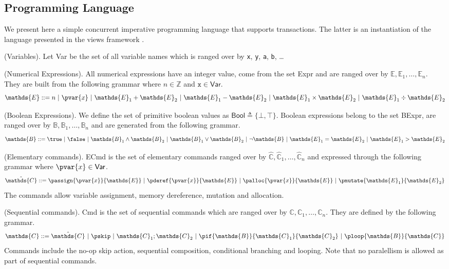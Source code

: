 \subsection{Programming Language}
\label{language}

We present here a simple concurrent imperative programming language that supports transactions. The latter is an instantiation of the language presented in the views framework \cite{views}.

 (Variables). Let \textsf{Var} be the set of all variable names which is ranged over by \texttt{x}, \texttt{y}, \texttt{a}, \texttt{b}, \ldots

 (Numerical Expressions). All numerical expressions have an integer value, come from the set \textsf{Expr} and are ranged over by $\mathds{E}, \mathds{E}_1, \ldots, \mathds{E}_n$. They are built from the following grammar where $n \in \mathds{Z}$ and $\mathtt{x} \in \mathsf{Var}$.
\[
	\mathds{E} ::=
		n\
		|\ \pvar{x}\
		|\ \mathds{E}_1 + \mathds{E}_2\
		|\ \mathds{E}_1 - \mathds{E}_2\
		|\ \mathds{E}_1 \times \mathds{E}_2\
		|\ \mathds{E}_1 \div \mathds{E}_2
\]

\defn (Boolean Expressions). We define the set of primitive boolean values as $\mathsf{Bool} \triangleq \{ \bot, \top \}$. Boolean expressions belong to the set \textsf{BExpr}, are ranged over by $\mathds{B}, \mathds{B}_1, \ldots, \mathds{B}_n$ and are generated from the following grammar.
\[
	\mathds{B} ::=
		\true\
		|\ \false\
		|\ \mathds{B}_1 \land \mathds{B}_2\
		|\ \mathds{B}_1 \lor \mathds{B}_2\
		|\ \lnot \mathds{B}\
		|\ \mathds{E}_1 = \mathds{E}_2\
		|\ \mathds{E}_1 > \mathds{E}_2
\]

 (Elementary commands). \textsf{ECmd} is the set of elementary commands ranged over by $\hat{\mathds{C}}, \hat{\mathds{C}}_1, \ldots, \hat{\mathds{C}}_n$ and expressed through the following grammar where $\pvar{x} \in \mathsf{Var}$.
\[
	\hat{\mathds{C}} ::=
		\passign{\pvar{x}}{\mathds{E}}\
		|\ \pderef{\pvar{x}}{\mathds{E}}\
		|\ \palloc{\pvar{x}}{\mathds{E}}\
		|\ \pmutate{\mathds{E}_1}{\mathds{E}_2}
\]
The commands allow variable assignment, memory dereference, mutation and allocation.

\defn (Sequential commands). \textsf{Cmd} is the set of sequential commands which are ranged over by $\mathds{C}, \mathds{C}_1, \ldots, \mathds{C}_n$. They are defined by the following grammar.
\[
	\mathds{C} ::=
		\hat{\mathds{C}}\
		|\ \pskip\
		|\ \mathds{C}_1; \mathds{C}_2\
		|\ \pif{\mathds{B}}{\mathds{C}_1}{\mathds{C}_2}\
		|\ \ploop{\mathds{B}}{\mathds{C}}
\]
Commands include the no-op skip action, sequential composition, conditional branching and looping. Note that no paralellism is allowed as part of sequential commands.

